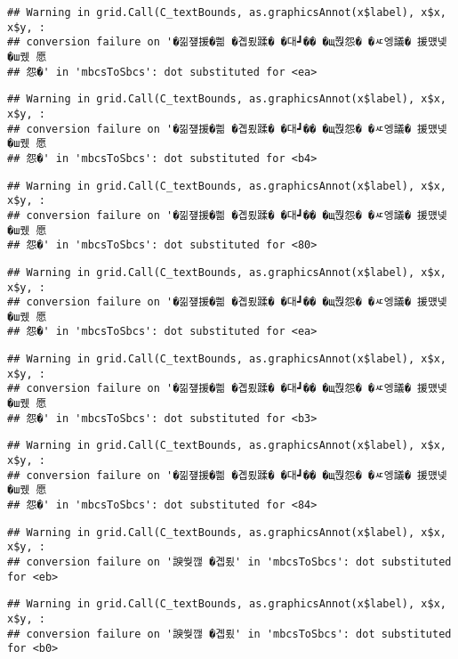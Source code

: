 \documentclass[
]{article}
\begin{document}
\begin{verbatim}
## Warning in grid.Call(C_textBounds, as.graphicsAnnot(x$label), x$x, x$y, :
## conversion failure on '�낆쟾援�쁾 �곕룄蹂� �대┛�� �щ쭩怨� �ㅼ엥議� 援먰넻�ш퀬 愿
## 怨�' in 'mbcsToSbcs': dot substituted for <ea>
\end{verbatim}

\begin{verbatim}
## Warning in grid.Call(C_textBounds, as.graphicsAnnot(x$label), x$x, x$y, :
## conversion failure on '�낆쟾援�쁾 �곕룄蹂� �대┛�� �щ쭩怨� �ㅼ엥議� 援먰넻�ш퀬 愿
## 怨�' in 'mbcsToSbcs': dot substituted for <b4>
\end{verbatim}

\begin{verbatim}
## Warning in grid.Call(C_textBounds, as.graphicsAnnot(x$label), x$x, x$y, :
## conversion failure on '�낆쟾援�쁾 �곕룄蹂� �대┛�� �щ쭩怨� �ㅼ엥議� 援먰넻�ш퀬 愿
## 怨�' in 'mbcsToSbcs': dot substituted for <80>
\end{verbatim}

\begin{verbatim}
## Warning in grid.Call(C_textBounds, as.graphicsAnnot(x$label), x$x, x$y, :
## conversion failure on '�낆쟾援�쁾 �곕룄蹂� �대┛�� �щ쭩怨� �ㅼ엥議� 援먰넻�ш퀬 愿
## 怨�' in 'mbcsToSbcs': dot substituted for <ea>
\end{verbatim}

\begin{verbatim}
## Warning in grid.Call(C_textBounds, as.graphicsAnnot(x$label), x$x, x$y, :
## conversion failure on '�낆쟾援�쁾 �곕룄蹂� �대┛�� �щ쭩怨� �ㅼ엥議� 援먰넻�ш퀬 愿
## 怨�' in 'mbcsToSbcs': dot substituted for <b3>
\end{verbatim}

\begin{verbatim}
## Warning in grid.Call(C_textBounds, as.graphicsAnnot(x$label), x$x, x$y, :
## conversion failure on '�낆쟾援�쁾 �곕룄蹂� �대┛�� �щ쭩怨� �ㅼ엥議� 援먰넻�ш퀬 愿
## 怨�' in 'mbcsToSbcs': dot substituted for <84>
\end{verbatim}

\begin{verbatim}
## Warning in grid.Call(C_textBounds, as.graphicsAnnot(x$label), x$x, x$y, :
## conversion failure on '諛쒖깮 �곕룄' in 'mbcsToSbcs': dot substituted for <eb>
\end{verbatim}

\begin{verbatim}
## Warning in grid.Call(C_textBounds, as.graphicsAnnot(x$label), x$x, x$y, :
## conversion failure on '諛쒖깮 �곕룄' in 'mbcsToSbcs': dot substituted for <b0>
\end{verbatim}
\end{document}
